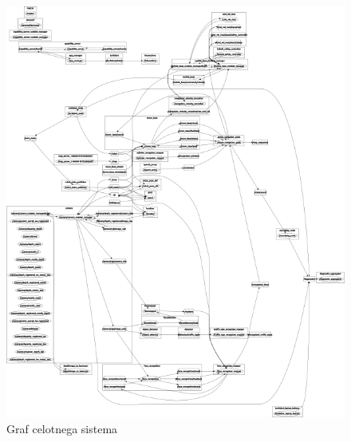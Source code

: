 \documentclass[a4paper,11pt]{article}
\begin{document}
\pagebreak
\begin{figure}[h]
\begin{center}
\includegraphics[scale=0.1]{systemGraph.png}
\caption{Graf celotnega sistema}
\label{systemGraph}
\end{center}
\end{figure}
\end{document}

